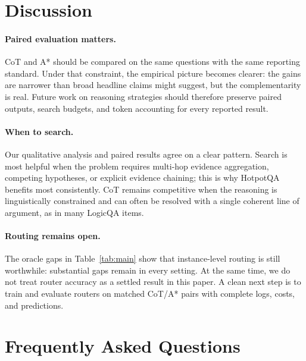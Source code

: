 \documentclass[11pt]{article}
\begin{document}
\section{Discussion}
\label{sec:discussion}

\paragraph{Paired evaluation matters.} CoT and A* should be compared on the same questions with the same reporting standard. Under that constraint, the empirical picture becomes clearer: the gains are narrower than broad headline claims might suggest, but the complementarity is real. Future work on reasoning strategies should therefore preserve paired outputs, search budgets, and token accounting for every reported result.

\paragraph{When to search.} Our qualitative analysis and paired results agree on a clear pattern. Search is most helpful when the problem requires multi-hop evidence aggregation, competing hypotheses, or explicit evidence chaining; this is why HotpotQA benefits most consistently. CoT remains competitive when the reasoning is linguistically constrained and can often be resolved with a single coherent line of argument, as in many LogicQA items.

\paragraph{Routing remains open.} The oracle gaps in Table~\ref{tab:main} show that instance-level routing is still worthwhile: substantial gaps remain in every setting. At the same time, we do not treat router accuracy as a settled result in this paper. A clean next step is to train and evaluate routers on matched CoT/A* pairs with complete logs, costs, and predictions.

\section{Frequently Asked Questions}
\label{sec:faq}
\end{document}
